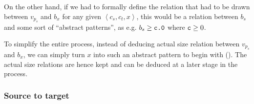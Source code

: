 On the other hand, if we had to formally define the relation that had to be
drawn between $v_{p_s}$ and $b_x$ for any given $\left\langle c_s,c_t,x
\right\rangle$, this would be a relation between $b_s$ and some sort of
``abstract patterns'', as e.g. $b_s\geq\text{{\ttfamily c.0}}$ where $\text{{\ttfamily c}}\geq 0$.

To simplify the entire process, instead of deducing actual size relation
between $v_{p_s}$ and $b_x$, we can simply turn $x$ into such an abstract
pattern to begin with (). The actual size
relations are hence kept and can be deduced at a later stage in the process.


\subsubsection{Source to target}\label{section:size-change-final}





